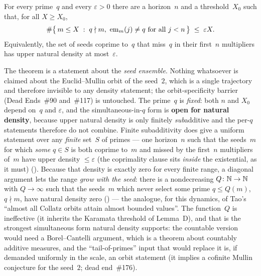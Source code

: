 \begin{theorem}
\label{thm:almost-all-capture}
For every prime~$q$ and every $\varepsilon > 0$ there are a horizon~$n$
and a threshold~$X_0$ such that, for all $X \geq X_0$,
\[
  \#\bigl\{\, m \leq X \;:\; q \nmid m,\ \seq{m}(j) \neq q
     \text{ for all } j < n \,\bigr\}
  \;\leq\; \varepsilon X .
\]
Equivalently, the set of seeds coprime to~$q$ that miss~$q$ in their
first~$n$ multipliers has upper natural density at most~$\varepsilon$.
\end{theorem}

\begin{remark}
\label{rem:seed-average-scope}
The theorem is a statement about the \emph{seed ensemble}.  Nothing
whatsoever is claimed about the Euclid--Mullin orbit of the seed~$2$, which
is a single trajectory and therefore invisible to any density statement;
the orbit-specificity barrier (Dead Ends~\#90 and~\#117) is untouched.
The prime~$q$ is \emph{fixed}: both $n$ and $X_0$ depend on~$q$ and
$\varepsilon$, and the simultaneous-in-$q$ form is \textbf{open for
natural density}, because upper natural density is only finitely
\emph{sub}additive and the per-$q$ statements therefore do not combine.
Finite subadditivity
does give a uniform
statement over any \emph{finite} set~$S$ of primes --- one horizon~$n$ such
that the seeds~$m$ for which \emph{some} $q \in S$ is both coprime to~$m$
and missed by the first~$n$ multipliers of~$m$ have upper density
$\le\varepsilon$ (the coprimality clause sits \emph{inside} the
existential, as it must)
().
Because that density is exactly zero for every finite range, a diagonal
argument lets the range \emph{grow with the seed}: there is a nondecreasing
$Q\colon\mathbb{N}\to\mathbb{N}$ with $Q\to\infty$ such that the seeds~$m$ which never
select some prime $q\le Q(m)$, $q\nmid m$, have natural density zero
() ---
the analogue, for this dynamics, of Tao's ``almost all Collatz orbits attain
almost bounded values''.  The function~$Q$ is ineffective (it inherits the
Karamata threshold of Lemma~D), and that is the strongest simultaneous form
natural density supports: the countable version would need a Borel--Cantelli
argument, which is a theorem about countably additive measures, and the
``tail-of-primes'' input that would replace it is, if demanded uniformly in
the scale, an orbit statement (it implies a cofinite Mullin conjecture for
the seed~$2$; dead end~\#176).


\end{remark}
